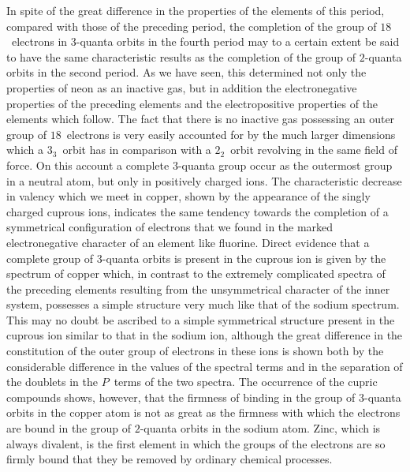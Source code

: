 In spite of the great difference in the properties of the elements
of this period, compared with those of the preceding period, the
completion of the group of $18$~electrons in $3$-quanta orbits in the
fourth period may to a certain extent be said to have the same
characteristic results as the completion of the group of $2$-quanta
orbits in the second period. As we have seen, this determined not
only the properties of neon as an inactive gas, but in addition the
electronegative properties of the preceding elements and the
electropositive properties of the elements which follow. The fact
that there is no inactive gas possessing an outer group of $18$~electrons
is very easily accounted for by the much larger dimensions
which a $3_{3}$~orbit has in comparison with a $2_{2}$~orbit revolving in the
same field of force. On this account a complete $3$-quanta group
 occur as the outermost group in a neutral atom, but only
in positively charged ions. The characteristic decrease in valency
which we meet in copper, shown by the appearance of the singly
charged cuprous ions, indicates the same tendency towards the
completion of a symmetrical configuration of electrons that we
found in the marked electronegative character of an element like
fluorine. Direct evidence that a complete group of $3$-quanta orbits
is present in the cuprous ion is given by the spectrum of copper
which, in contrast to the extremely complicated spectra of the
preceding elements resulting from the unsymmetrical character of
the inner system, possesses a simple structure very much like that
of the sodium spectrum. This may no doubt be ascribed to a
simple symmetrical structure present in the cuprous ion similar to
that in the sodium ion, although the great difference in the constitution
of the outer group of electrons in these ions is shown
both by the considerable difference in the values of the spectral
terms and in the separation of the doublets in the $P$~terms of the
two spectra. The occurrence of the cupric compounds shows, however,
that the firmness of binding in the group of $3$-quanta orbits
in the copper atom is not as great as the firmness with which the
electrons are bound in the group of $2$-quanta orbits in the sodium
atom. Zinc, which is always divalent, is the first element in which
the groups of the electrons are so firmly bound that they 
be removed by ordinary chemical processes.

